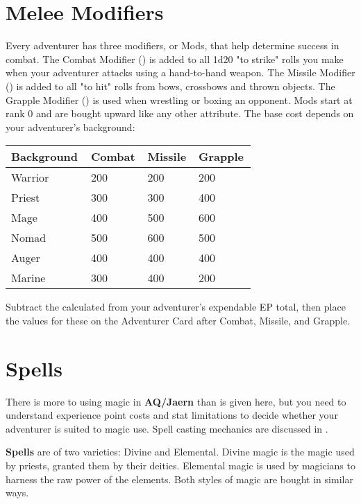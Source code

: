 \section{Melee Modifiers}
Every adventurer has three modifiers, or Mods, that help determine success in combat. The Combat Modifier (\CM) is added to all 1d20 "to strike" rolls you make when your adventurer attacks using a hand-to-hand weapon. The Missile Modifier (\MM) is added to all "to hit" rolls from bows, crossbows and thrown objects. The Grapple Modifier (\GM) is used when wrestling or boxing an opponent. Mods start at rank 0 and are bought upward like any other attribute. The base cost depends on your adventurer's background:

\begin{normboxc}

\small
\begin{tabular}{@{} p{0.25\linewidth} p{0.15\linewidth} p{0.15\linewidth} p{0.15\linewidth}}
\textbf{Background} & \textbf{Combat} & \textbf{Missile} & \textbf{Grapple}\\
\midrule
Warrior & 200 & 200 & 200\\
Priest & 300 & 300 & 400\\
Mage & 400 & 500 & 600\\
Nomad & 500 & 600 & 500\\
Auger & 400 & 400 & 400\\
Marine & 300 & 400 & 200\\
\end{tabular}
\end{normboxc}

Subtract the calculated \EP from your adventurer's expendable EP total, then place the values for these on the Adventurer Card after Combat, Missile, and Grapple.
\section{Spells}

There is more to using magic in \textbf{AQ/Jaern} than is given here, but you need to understand experience point costs and stat limitations to decide whether your adventurer is suited to magic use. Spell casting mechanics are discussed in .

\textbf{Spells} are of two varieties: Divine and Elemental. Divine magic is the magic used by priests, granted them by their deities. Elemental magic is used by magicians to harness the raw power of the elements. Both styles of magic are bought in similar ways.


